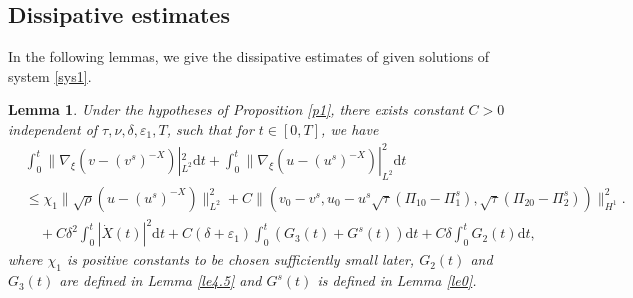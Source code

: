\documentclass[10pt,reqno]{amsart}
\numberwithin{equation}{section}
\newtheorem{lemma}[theorem]{Lemma}
\newcommand{\dif}{\mathrm{d}}
\newcommand{\ddiv}{\mathrm{div}}
\begin{document}
\subsection{Dissipative estimates}
In the following lemmas, we give the dissipative estimates of given solutions of system \eqref{sys1}.
 \begin{lemma}\label{lehs1}
Under the hypotheses of Proposition \ref{p1}, there exists constant $C>0$ independent of $\tau, \nu, \delta, \varepsilon_1, T$, such that for $t\in[0, T]$, we have
\begin{equation}\label{hsgj1.1}
\begin{aligned}
&\int_0^t\|\nabla_\xi(v-(v^s)^{-X})|_{L^2}^2\dif t+\int_0^t\|\nabla_\xi(u-(u^s)^{-X})|_{L^2}^2\dif t\\
&\le 
\chi_1\|\sqrt\rho(u-(u^s)^{-X})\|_{L^2}^2
+C\|(v_0-v^s, u_0-u^s
\sqrt{\tau}(\Pi_{10}-\Pi_1^s), \sqrt{\tau}(\Pi_{20}-\Pi_2^s))\|_{H^1}^2.
\\
&\quad+C\delta^2\int_0^t|\dot X(t)|^2\dif t
+C(\delta
+\varepsilon_1)\int_0^t\left(G_3(t)+G^s(t)\right)\dif t+C\delta\int_0^t G_2(t)\dif t,
\end{aligned}
\end{equation}
where $\chi_1$ is positive constants to be chosen sufficiently small later, $G_2(t)$ and $G_{3}(t)$ are defined in Lemma \ref{le4.5} and $G^s(t)$ is defined in Lemma \ref{le0}.
\end{lemma}
\end{document}
